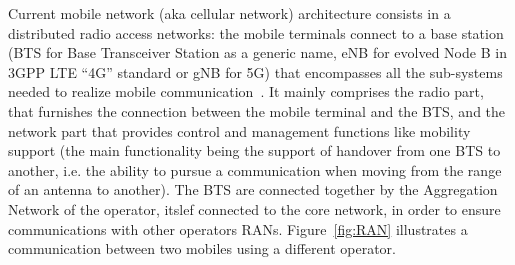 Current mobile network (aka cellular network) architecture consists in a distributed radio access networks: the mobile terminals connect to a base station (BTS for Base Transceiver Station as a generic name, eNB for evolved Node B in 3GPP LTE “4G” standard or gNB for 5G) that encompasses all the sub-systems needed to realize mobile communication~\cite{bouguen2012lte}. It mainly comprises the radio part, that furnishes the connection between the mobile terminal and the BTS, and the network part that provides control and management functions like mobility support (the main functionality being the support of handover from one BTS to another, i.e. the ability to pursue a communication when moving from the range of an antenna to another).
The BTS are connected together by the Aggregation Network of the operator, itslef connected to the core network, in order to ensure communications with other operators RANs. Figure~\ref{fig:RAN} illustrates a communication between two mobiles using a different operator.

